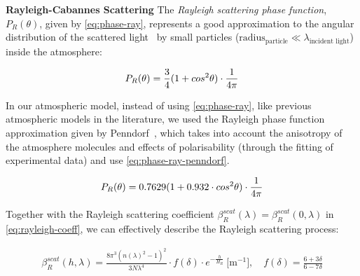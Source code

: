 \documentclass[journal]{vgtc}                %
\newcommand{\review}[1]{{\color{blue}#1}}
\begin{document}
\noindent \textbf{Rayleigh-Cabannes Scattering} \quad The \textit{Rayleigh scattering phase function}, $P_R(\theta)$, given by \autoref{eq:phase-ray}, represents a good approximation \review{to} the angular distribution of the scattered light~\cite{Thomas:2017} by small particles ($\text{radius}_{\text{particle}} \ll \lambda_{\text{incident light}}$) inside the atmosphere:

\vspace*{-2mm}
\begin{equation} \label{eq:phase-ray}
\small
P_R(\theta) = \frac{3}{4}(1+cos^2\theta) \cdot\frac{1}{4\pi}
\end{equation}
\vspace*{-2mm}


In our atmospheric model, instead of using \autoref{eq:phase-ray}, like previous atmospheric models in the literature, we used the Rayleigh phase function approximation given by Penndorf~\cite{Penndorf:1957tables}, which takes into account the anisotropy of the atmosphere molecules and effects of polarisability (through the fitting of experimental data) and use \autoref{eq:phase-ray-penndorf}.

\vspace*{-2mm}
\begin{equation} \label{eq:phase-ray-penndorf}
\small
P_R(\theta) = 0.7629(1 + 0.932\cdot cos^2\theta) \cdot\frac{1}{4\pi}
\end{equation}
\vspace*{-2mm}

\review{Together with the Rayleigh scattering coefficient $\beta_R^{scat}(\lambda) = \beta_R^{scat}(0, \lambda)$ in \autoref{eq:rayleigh-coeff}, we can effectively describe the Rayleigh scattering process:}

\vspace*{-4mm}
{
  \small
\begin{align}
\beta_R^{scat}(h, \lambda) = \frac{8\pi^3(n(\lambda)^2-1)^2}{3N\lambda^4} \cdot f(\delta) \cdot e^{-\frac{h}{H_R}}\ \big[\text{m}^{-1}\big] \label{eq:rayleigh-coeff}, \quad f(\delta) = \frac{6 + 3\delta}{6 - 7\delta}
\end{align}
}
\vspace*{-4mm}
\end{document}
